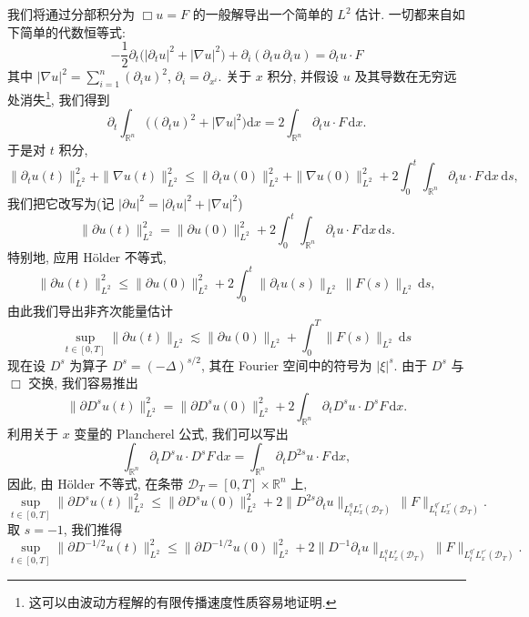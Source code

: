 
我们将通过分部积分为 $\Box u=F$ 的一般解导出一个简单的 $L^2$ 估计. 一切都来自如下简单的代数恒等式:
\begin{equation}
-\frac{1}{2}\partial_t\bigl(|\partial_t u|^2+|\nabla u|^2\bigr)+\partial_i(\partial_t u\, \partial_i u)=\partial_t u\cdot F\label{eq:c8-341}
\end{equation}
其中 $|\nabla u|^2=\sum_{i=1}^n(\partial_i u)^2$, $\partial_i=\partial_{x^i}$. 关于 $x$ 积分, 并假设 $u$ 及其导数在无穷远处消失\footnote{这可以由波动方程解的有限传播速度性质容易地证明. }, 我们得到
\[
\partial_t\int_{\mathbb{R}^n}\bigl((\partial_t u)^2+|\nabla u|^2\bigr)\mathrm{d}x=2\int_{\mathbb{R}^n}\partial_t u\cdot F\, \mathrm{d}x .
\]
于是对 $t$ 积分, 
\[
\|\partial_t u(t)\|_{L^2}^2+\|\nabla u(t)\|_{L^2}^2
\leq\|\partial_t u(0)\|_{L^2}^2+\|\nabla u(0)\|_{L^2}^2+2\int_0^t\!\int_{\mathbb{R}^n}\partial_t u\cdot F\, \mathrm{d}x\, \mathrm{d}s, 
\]
我们把它改写为(记 $|\partial u|^2=|\partial_t u|^2+|\nabla u|^2$)
\begin{equation}
\|\partial u(t)\|_{L^2}^2=\|\partial u(0)\|_{L^2}^2+2\int_0^t\!\int_{\mathbb{R}^n}\partial_t u\cdot F\, \mathrm{d}x\, \mathrm{d}s.\label{eq:c8-342}
\end{equation}
特别地, 应用 Hölder 不等式, 
\[
\|\partial u(t)\|_{L^2}^2\leq\|\partial u(0)\|_{L^2}^2+2\int_0^t\|\partial_t u(s)\|_{L^2}\, \|F(s)\|_{L^2}\, \mathrm{d}s, 
\]
由此我们导出非齐次能量估计
\begin{equation}
\sup_{t\in[0, T]}\|\partial u(t)\|_{L^2}\lesssim\|\partial u(0)\|_{L^2}+\int_0^T\|F(s)\|_{L^2}\, \mathrm{d}s\label{eq:c8-343}
\end{equation}
现在设 $D^s$ 为算子 $D^s=(-\Delta)^{s/2}$, 其在 Fourier 空间中的符号为 $|\xi|^s$. 由于 $D^s$ 与 $\Box$ 交换, 我们容易推出
\[
\|\partial D^s u(t)\|_{L^2}^2=\|\partial D^s u(0)\|_{L^2}^2+2\int_{\mathbb{R}^n}\partial_t D^s u\cdot D^s F\, \mathrm{d}x .
\]
利用关于 $x$ 变量的 Plancherel 公式, 我们可以写出
\[
\int_{\mathbb{R}^n}\partial_t D^s u\cdot D^s F\, \mathrm{d}x=\int_{\mathbb{R}^n}\partial_t D^{2s}u\cdot F\, \mathrm{d}x, 
\]
因此, 由 Hölder 不等式, 在条带 $\mathcal{D}_T=[0, T]\times\mathbb{R}^n$ 上, 
\[
\sup_{t\in[0, T]}\|\partial D^s u(t)\|_{L^2}^2
\leq\|\partial D^s u(0)\|_{L^2}^2+2\|D^{2s}\partial_t u\|_{L_t^q L_x^r(\mathcal{D}_T)}\, \|F\|_{L_t^{q'} L_x^{r'}(\mathcal{D}_T)} .
\]
取 $s=-1$, 我们推得
\[
\sup_{t\in[0, T]}\|\partial D^{-1/2}u(t)\|_{L^2}^2
\leq\|\partial D^{-1/2}u(0)\|_{L^2}^2+2\|D^{-1}\partial_t u\|_{L_t^q L_x^r(\mathcal{D}_T)}\, \|F\|_{L_t^{q'} L_x^{r'}(\mathcal{D}_T)} .
\]
